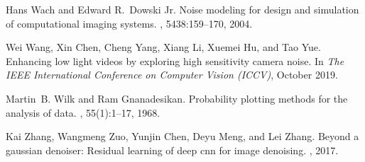 \documentclass[10pt,twocolumn,letterpaper]{article}
\begin{document}
\begin{thebibliography}{10}
Hans Wach and Edward R.~Dowski Jr.
\newblock Noise modeling for design and simulation of computational imaging
  systems.
, 5438:159--170, 2004.

Wei Wang, Xin Chen, Cheng Yang, Xiang Li, Xuemei Hu, and Tao Yue.
\newblock Enhancing low light videos by exploring high sensitivity camera
  noise.
\newblock In {\em The IEEE International Conference on Computer Vision (ICCV)},
  October 2019.

Martin~B. Wilk and Ram Gnanadesikan.
\newblock Probability plotting methods for the analysis of data.
, 55(1):1--17, 1968.

Kai Zhang, Wangmeng Zuo, Yunjin Chen, Deyu Meng, and Lei Zhang.
\newblock Beyond a gaussian denoiser: Residual learning of deep cnn for image
  denoising.
, 2017.

\end{thebibliography}
\end{document}
